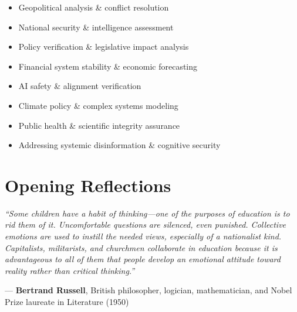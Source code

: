 \documentclass[11pt,a4paper]{article}
\theoremstyle{definition}
\theoremstyle{remark}
\begin{document}
\begin{small}
\begin{center}
\begin{minipage}{0.88\textwidth}
\begin{itemize}[nosep, itemsep=0.2em, topsep=0pt, leftmargin=1.5em]
    \item Geopolitical analysis \& conflict resolution
    \item National security \& intelligence assessment
    \item Policy verification \& legislative impact analysis
    \item Financial system stability \& economic forecasting
    \item AI safety \& alignment verification
    \item Climate policy \& complex systems modeling
    \item Public health \& scientific integrity assurance
    \item Addressing systemic disinformation \& cognitive security
\end{itemize}
\end{minipage}
\end{center}
\end{small}

\clearpage


\section*{Opening Reflections}

\begin{mdframed}[backgroundcolor=gray!10]
\textit{``Some children have a habit of thinking---one of the purposes of education is to rid them of it. Uncomfortable questions are silenced, even punished. Collective emotions are used to instill the needed views, especially of a nationalist kind. Capitalists, militarists, and churchmen collaborate in education because it is advantageous to all of them that people develop an emotional attitude toward reality rather than critical thinking.''}

--- \textbf{Bertrand Russell}, British philosopher, logician, mathematician, and Nobel Prize laureate in Literature (1950) \cite{russell_education}
\end{mdframed}

\vspace{0.5cm}
\end{document}
